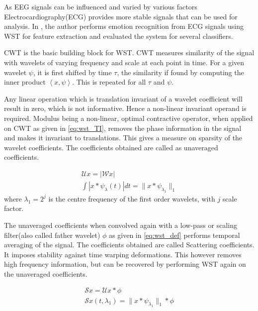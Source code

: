 As EEG signals can be influenced and varied by various factors Electrocardiography(ECG) provides more stable signals that can be used for analysis. In \cite{2021_ECG_WST_ML}, the author performs emotion recognition from ECG signals using WST for feature extraction and evaluated the system for several classifiers.

CWT is the basic building block for WST. CWT measures similarity of the signal with wavelets of varying frequency and scale at each point in time. For a given wavelet $\psi$, it is first shifted by time $\tau$, the similarity if found by computing the inner product $\left\langle x, \psi \right\rangle$. This is repeated for all $\tau$ and $\psi$.

Any linear operation which is translation invariant of a wavelet coefficient will result in zero, which is not informative. Hence a non-linear invariant operand is required. Modulus being a non-linear, optimal contractive operator, when applied on CWT as given in \ref{eq:wst_TI}, removes the phase information in the signal and makes it invariant to translations. This gives a measure on sparsity of the wavelet coefficients. The coefficients obtained are called as unaveraged coefficients. 

\begin{equation} \label{eq:wst_TI}
    \begin{split}
     \mathcal{U} x = |\mathcal{W} x|\\
     \int | x \ast \psi_\lambda(t) | dt = \| x \ast \psi_{\lambda_{1}}\|_1 
    \end{split}
\end{equation}
where $\lambda_1 = 2^j$ is the centre frequency of the first order wavelets, with $j$ scale factor.

The unaveraged coefficients when convolved again with a low-pass or scaling filter(also called father wavelet) $\phi$ as given in \ref{eq:wst_def} performs temporal averaging of the signal. The coefficients obtained are called Scattering coefficients. It imposes stability against time warping deformations. This however removes high frequency information, but can be recovered by performing WST again on the unaveraged coefficients.

\begin{equation} \label{eq:wst_def}
    \begin{split}
        \mathcal{S} x = \mathcal{U} x \ast \phi\\
        \mathcal{S} x(t, \lambda_1) = \| x \ast \psi_{\lambda_{1}}\|_1 \ast \phi         
    \end{split}
\end{equation}

